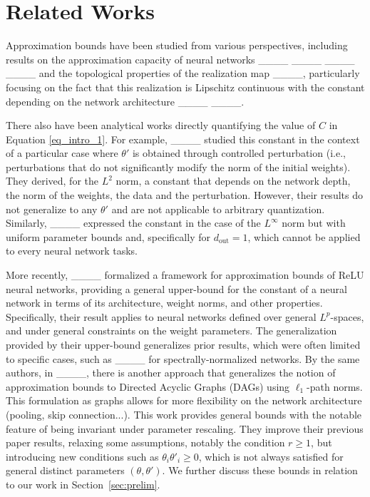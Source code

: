 \section{Related Works}
\label{sec:related_works}
	
	Approximation bounds have been studied from various perspectives, including results on the approximation capacity of neural networks ____ ____ ____ ____ and the topological properties of the realization map ____, particularly focusing on the fact that this realization is Lipschitz continuous with the constant depending on the network architecture ____ ____.
	
	There also have been analytical works directly quantifying the value of \( C \) in Equation \eqref{eq_intro_1}. For example, ____ studied this constant in the context of a particular case where \( \theta' \) is obtained through controlled perturbation (i.e., perturbations that do not significantly modify the norm of the initial weights). They derived, for the \( L^2 \) norm, a constant that depends on the network depth, the norm of the weights, the data and the perturbation. However, their results do not generalize to any \( \theta' \) and  are not applicable to arbitrary quantization. Similarly, ____ expressed the constant in the case of the \( L^\infty \) norm but with uniform parameter bounds and, specifically for \( d_{\text{out}} = 1 \), which cannot be applied to every neural network tasks.
	
	More recently, ____ formalized a framework for approximation bounds of ReLU neural networks, providing a general upper-bound for the constant of a neural network in terms of its architecture, weight norms, and other properties. Specifically, their result applies to neural networks defined over general \(L^p\)-spaces, and under general constraints on the weight parameters. The generalization provided by their upper-bound generalizes prior results, which were often limited to specific cases, such as ____ for spectrally-normalized networks.
	By the same authors, in ____, there is another approach that generalizes the notion of approximation bounds to Directed Acyclic Graphs (DAGs) using \( \ell_1 \)-path norms. This formulation as graphs allows for more flexibility on the network architecture (pooling, skip connection...). This work provides general bounds with the notable feature of being invariant under parameter rescaling. They improve their previous paper results, relaxing some assumptions, notably the condition \( r \geq 1 \), but introducing new conditions such as \( \theta_i \theta'_i \geq 0 \), which is not always satisfied for general distinct parameters $(\theta,\theta')$. We further discuss these bounds  in relation to our work in Section~\ref{sec:prelim}.
	
